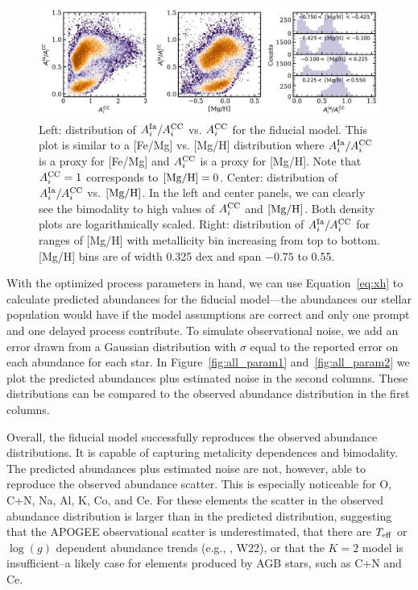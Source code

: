 \documentclass[modern]{aastex631}
\newcommand{\mgh}{[{\rm Mg}/{\rm H}]}
\newcommand{\logg}{\log(g)}
\newcommand{\teff}{T_{\rm eff}}
\newcommand{\Acc}{A^{\rm CC}_{i}}
\newcommand{\AIa}{A^{\rm Ia}_{i}}
\begin{document}
\begin{figure}[htb!]
    \centering
    \includegraphics[width=\textwidth]{Paper/Figures/As.pdf}
    \caption{Left: distribution of $\AIa/\Acc$ vs. $\Acc$ for the fiducial model. This plot is similar to a [Fe/Mg] vs. [Mg/H] distribution where $\AIa/\Acc$ is a proxy for [Fe/Mg] and $\Acc$ is a proxy for [Mg/H]. Note that $\Acc = 1$ corresponds to $\mgh = 0$. Center: distribution of $\AIa/\Acc$ vs. $\mgh$. In the left and center panels, we can clearly see the bimodality to high values of $\Acc$ and $\mgh$. Both density plots are logarithmically scaled. Right: distribution of $\AIa/\Acc$ for ranges of [Mg/H] with metallicity bin increasing from top to bottom. [Mg/H] bins are of width 0.325 dex and span $-0.75$ to 0.55.}
    \label{fig:As}
\end{figure}

With the optimized process parameters in hand, we can use Equation~\ref{eq:xh} to calculate predicted abundances for the fiducial model---the abundances our stellar population would have if the model assumptions are correct and only one prompt and one delayed process contribute. To simulate observational noise, we add an error drawn from a Gaussian distribution with $\sigma$ equal to the reported error on each abundance for each star. In Figure~\ref{fig:all_param1} and~\ref{fig:all_param2} we plot the predicted abundances plus estimated noise in the second columns. These distributions can be compared to the observed abundance distribution in the first columns.

Overall, the fiducial model successfully reproduces the observed abundance distributions. It is capable of capturing metalicity dependences and bimodality. The predicted abundances plus estimated noise are not, however, able to reproduce the observed abundance scatter. This is especially noticeable for O, C+N, Na, Al, K, Co, and Ce. For these elements the scatter in the observed abundance distribution is larger than in the predicted distribution, suggesting that the APOGEE observational scatter is underestimated, that there are $\teff$ or $\logg$ dependent abundance trends (e.g., \citealp{griffith2021a}, W22), or that the $K=2$ model is insufficient--a likely case for elements produced by AGB stars, such as C+N and Ce.
\end{document}
